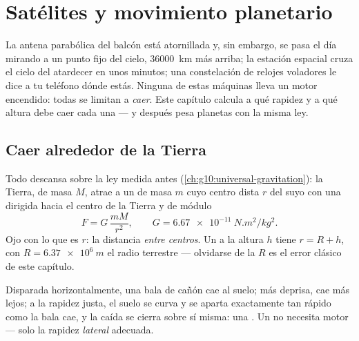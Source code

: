 \chapter{Satélites y movimiento planetario}\label{ch:g12:satellites-kepler}

La antena parabólica del balcón está atornillada y, sin embargo, se pasa el día
mirando a un punto fijo del cielo, \qty{36000}{km} más arriba; la estación espacial
cruza el cielo del atardecer en unos minutos; una constelación de relojes voladores le
dice a tu teléfono dónde estás. Ninguna de estas máquinas lleva un motor encendido:
todas se limitan a \emph{caer}. Este capítulo calcula a qué rapidez y a qué altura
debe caer cada una --- y después pesa planetas con la misma ley.

\section{Caer alrededor de la Tierra}

Todo descansa sobre la ley medida antes
(\cref{ch:g10:universal-gravitation}): la Tierra, de masa $M$, atrae a un  de
masa $m$ cuyo centro dista $r$ del suyo con una  dirigida hacia el centro de la
Tierra y de módulo
\[ F = G\,\frac{m M}{r^2}, \qquad G = \qty{6.67e-11}{N.m^2/kg^2}. \]
Ojo con lo que es $r$: la distancia \emph{entre centros}. Un  a la altura $h$
tiene $r = R + h$, con $R = \qty{6.37e6}{m}$ el radio terrestre --- olvidarse de la
$R$ es el error clásico de este capítulo.

\begin{remark}\label{rem:g12:satellites-kepler:cannon}
Disparada horizontalmente, una bala de cañón cae al suelo; más deprisa, cae más lejos;
a la rapidez justa, el suelo se curva y se aparta exactamente tan rápido como la bala
cae, y la caída se cierra sobre sí misma: una . Un  no necesita motor
--- solo la rapidez \emph{lateral} adecuada.
\end{remark}


